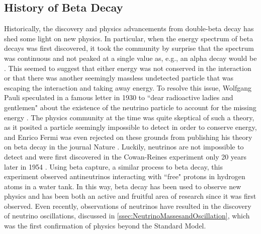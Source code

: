 \subsection{History of Beta Decay}
Historically, the discovery and physics advancements from double-beta decay has shed some light on new physics. In particular, when the energy spectrum of beta decays was first discovered, it took the community by surprise that the spectrum was continuous and not peaked at a single value as, e.g., an alpha decay would be \cite{o.vonbayero.hahnl.meitner}. This seemed to suggest that either energy was not conserved in the interaction or that there was another seemingly massless undetected particle that was escaping the interaction and taking away energy. To resolve this issue, Wolfgang Pauli speculated in a famous letter in 1930 to ``dear radioactive ladies and gentlemen" about the existence of the neutrino particle to account for the missing energy \cite{pauli_1930}. The physics community at the time was quite skeptical of such a theory, as it posited a particle seemingly impossible to detect in order to conserve energy, and Enrico Fermi was even rejected on these grounds from publishing his theory on beta decay in the journal Nature \cite{fermi_1934}. Luckily, neutrinos are not impossible to detect and were first discovered in the Cowan-Reines experiment only 20 years later in 1954 \cite{PhysRev.92.830}. Using beta capture, a similar process to beta decay, this experiment observed antineutrinos interacting with ``free" protons in hydrogen atoms in a water tank. In this way, beta decay has been used to observe new physics and has been both an active and fruitful area of research since it was first observed. Even recently, observations of neutrinos have resulted in the discovery of neutrino oscillations, discussed in \autoref{ssec:NeutrinoMassesandOscillation}, which was the first confirmation of physics beyond the Standard Model.

